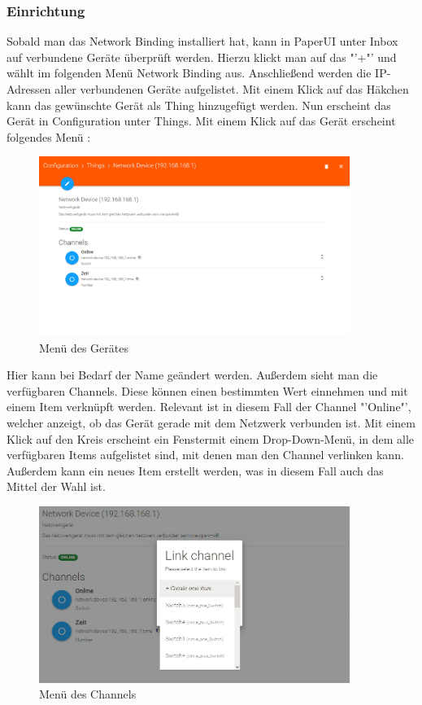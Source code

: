 \subsubsection{Einrichtung}
Sobald man das Network Binding installiert hat, kann in PaperUI unter Inbox auf verbundene Geräte überprüft werden. Hierzu klickt man auf das "'+"' und wählt im folgenden Menü Network Binding aus. Anschließend werden die IP-Adressen aller verbundenen Geräte aufgelistet. Mit einem Klick auf das Häkchen kann das gewünschte Gerät als Thing hinzugefügt werden. Nun erscheint das Gerät in Configuration unter Things. Mit einem Klick auf das Gerät erscheint folgendes Menü :
\begin{figure}[H]
	\centering
	\includegraphics[width=0.9\textwidth]{Bilder/WLANthing.PNG}
	\caption{Menü des Gerätes}
	\label{fig:WLANthing}
\end{figure}

Hier kann bei Bedarf der Name geändert werden. Außerdem sieht man die verfügbaren Channels. Diese können einen bestimmten Wert einnehmen und mit einem Item verknüpft werden. Relevant ist in diesem Fall der Channel "'Online"', welcher anzeigt, ob das Gerät gerade mit dem Netzwerk verbunden ist. Mit einem Klick auf den Kreis erscheint ein Fenstermit einem Drop-Down-Menü, in dem alle verfügbaren Items aufgelistet sind, mit denen man den Channel verlinken kann. Außerdem kann ein neues Item erstellt werden, was in diesem Fall auch das Mittel der Wahl ist. 

\begin{figure}[H]
	\centering
	\includegraphics[width=0.9\textwidth]{Bilder/WLANchannel.PNG}
	\caption{Menü des Channels}
	\label{fig:WLANchannel}
\end{figure}

